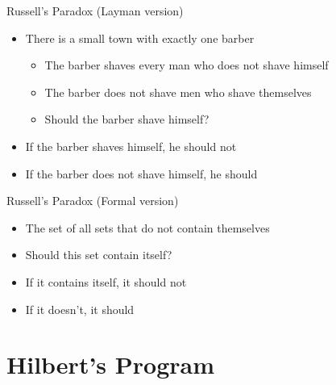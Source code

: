 \documentclass[utf8]{beamer}
\begin{document}
\begin{frame}{Russell's Paradox (Layman version)}
\begin{itemize}
\item There is a small town with exactly one barber
\begin{itemize}
\item The barber shaves every man who does not shave himself
\item The barber does not shave men who shave themselves
\item Should the barber shave himself?
\end{itemize}
\item If the barber shaves himself, he should not
\item If the barber does not shave himself, he should
\end{itemize}
\end{frame}

\begin{frame}{Russell's Paradox (Formal version)}
\begin{itemize}
\item The set of all sets that do not contain themselves
\item Should this set contain itself?
\item If it contains itself, it should not
\item If it doesn't, it should
\end{itemize}
\end{frame}

\part{Hilbert's Program}
\begin{frame}
\partpage
\end{frame}
\end{document}
